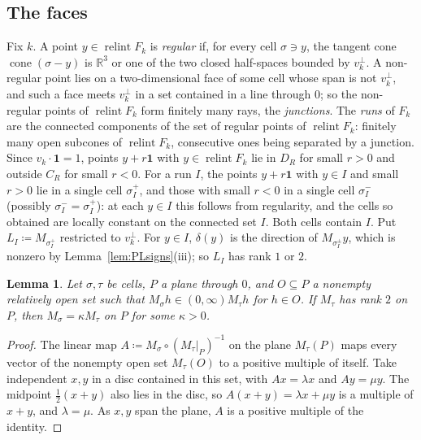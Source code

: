 \documentclass[11pt]{article}
\newcommand{\R}{\mathbb{R}}
\newcommand{\one}{\mathbf{1}}
\DeclareMathOperator{\cone}{cone}
\DeclareMathOperator{\relint}{relint}
\theoremstyle{plain}
\newtheorem{lemma}[theorem]{Lemma}
\theoremstyle{definition}
\theoremstyle{remark}
\begin{document}
\subsection*{The faces}

Fix $k$. A point $y\in\relint F_k$ is \emph{regular} if, for every cell $\sigma\ni y$, the
tangent cone $\cone(\sigma-y)$ is $\R^3$ or one of the two closed half-spaces bounded by
$v_k^\perp$. A non-regular point lies on a two-dimensional face of some cell whose span is
not $v_k^\perp$, and such a face meets $v_k^\perp$ in a set contained in a line through
$0$; so the non-regular points of $\relint F_k$ form finitely many rays, the
\emph{junctions}. The \emph{runs} of $F_k$ are the connected components of the set of
regular points of $\relint F_k$: finitely many open subcones of $\relint F_k$, consecutive
ones being separated by a junction. Since $v_k\cdot\one=1$, points $y+r\one$ with $y\in
\relint F_k$ lie in $D_R$ for small $r>0$ and outside $C_R$ for small $r<0$. For a run $I$,
the points $y+r\one$ with $y\in I$ and small $r>0$ lie in a single cell $\sigma^+_I$, and
those with small $r<0$ in a single cell $\sigma^-_I$ (possibly $\sigma^-_I=\sigma^+_I$):
at each $y\in I$ this follows from regularity, and the cells so obtained are locally
constant on the connected set $I$. Both cells contain $I$. Put $L_I\coloneqq M_{\sigma^+_I}$
restricted to $v_k^\perp$. For $y\in I$, $\delta(y)$ is the direction of $M_{\sigma^\pm_I}
y$, which is nonzero by Lemma~\ref{lem:PLsigns}(iii); so $L_I$ has rank $1$ or $2$.

\begin{lemma}\label{lem:wallfactor}
Let $\sigma,\tau$ be cells, $P$ a plane through $0$, and $O\subseteq P$ a nonempty
relatively open set such that $M_\sigma h\in(0,\infty)M_\tau h$ for $h\in O$. If $M_\tau$
has rank $2$ on $P$, then $M_\sigma=\kappa M_\tau$ on $P$ for some $\kappa>0$.
\end{lemma}

\begin{proof}
The linear map $A\coloneqq M_\sigma\circ(M_\tau|_P)^{-1}$ on the plane $M_\tau(P)$ maps
every vector of the nonempty open set $M_\tau(O)$ to a positive multiple of itself. Take
independent $x,y$ in a disc contained in this set, with $Ax=\lambda x$ and $Ay=\mu y$. The
midpoint $\frac12(x+y)$ also lies in the disc, so $A(x+y)=\lambda x+\mu y$ is a multiple
of $x+y$, and $\lambda=\mu$. As $x,y$ span the plane, $A$ is a positive multiple of the
identity.
\end{proof}
\end{document}

